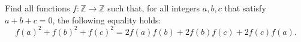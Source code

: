 Find all functions 
$f:\mathbb Z\rightarrow \mathbb Z$
 such that, for all integers 
$a,b,c$
 that satisfy 
$a+b+c=0$, 
 the following equality holds:
\[f(a)^2+f(b)^2+f(c)^2=2f(a)f(b)+2f(b)f(c)+2f(c)f(a).\]

